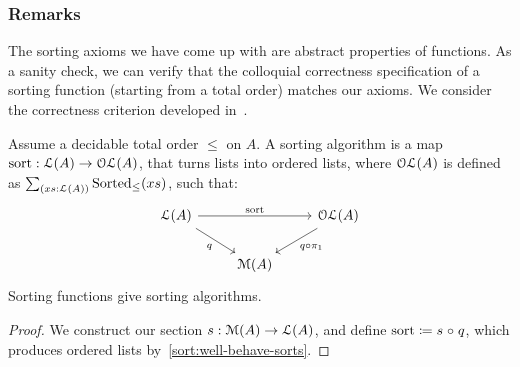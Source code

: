 \subsubsection*{Remarks}

The sorting axioms we have come up with are abstract properties of functions.
%
As a sanity check, we can verify that the colloquial correctness specification of a sorting function (starting from a
total order) matches our axioms. We consider the correctness criterion developed in~\cite{alexandruIntrinsicallyCorrectSorting2023}.
%
\begin{proposition}
    \label{prop:sort-correctness}
    Assume a decidable total order $\leq$ on $A$.
    A sorting algorithm is a map $\term{sort} : {\LL(A) \to \OLL(A)}$,
    that turns lists into ordered lists,
    where $\mathcal{OL}(A)$ is defined as $\dsum{xs : \LL(A)}{\term{Sorted}_{\leq}(xs)}$,
    such that:
    \[\begin{tikzcd}
            {\LL(A)} && {\OLL(A)} \\
            & {\MM(A)}
            \arrow["{\term{sort}}", from=1-1, to=1-3]
            \arrow["q"', from=1-1, to=2-2]
            \arrow["{q \comp \pi_1}", from=1-3, to=2-2]
        \end{tikzcd}\]
    Sorting functions give sorting algorithms.
\end{proposition}
\begin{proof}
    We construct our section $s:\mathcal{M}(A) \to \mathcal{L}(A)$,
    and define $\term{sort} \defeq s \comp q$,
    which produces ordered lists by~\cref{sort:well-behave-sorts}.
\end{proof}
